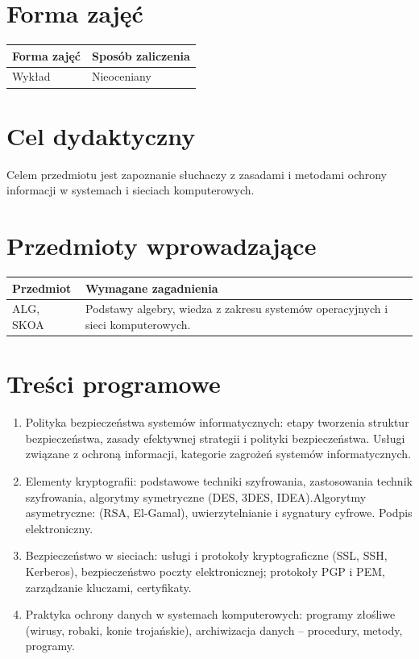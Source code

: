 \documentclass[12pt, a4paper]{article}
\begin{document}
\section{Forma zajęć}

\begin{tabular}{ll}
  \hline
  \textbf{Forma zajęć} & \textbf{Sposób zaliczenia} \\
  \hline
  Wykład & Nieoceniany \\
  \hline
\end{tabular}

\section{Cel dydaktyczny}

Celem przedmiotu jest zapoznanie słuchaczy z zasadami i metodami ochrony informacji w systemach i sieciach komputerowych.

\section{Przedmioty wprowadzające}

\begin{tabularx}{\textwidth}{lX}
  \hline
  \textbf{Przedmiot} & \textbf{Wymagane zagadnienia} \\
  \hline
  ALG, SKOA & Podstawy algebry, wiedza z zakresu systemów operacyjnych i sieci komputerowych. \\
  \hline
\end{tabularx}

\section{Treści programowe}

\begin{enumerate}
  \item Polityka bezpieczeństwa systemów informatycznych: etapy tworzenia struktur bezpieczeństwa, zasady efektywnej strategii i polityki bezpieczeństwa. Usługi związane z ochroną informacji, kategorie zagrożeń systemów informatycznych.
  \item Elementy kryptografii: podstawowe techniki szyfrowania, zastosowania technik szyfrowania, algorytmy symetryczne (DES, 3DES, IDEA).Algorytmy asymetryczne: (RSA, El-Gamal), uwierzytelnianie i sygnatury cyfrowe. Podpis elektroniczny.
  \item Bezpieczeństwo w sieciach: usługi i protokoły kryptograficzne (SSL, SSH, Kerberos), bezpieczeństwo poczty elektronicznej; protokoły PGP i PEM, zarządzanie kluczami, certyfikaty.
  \item Praktyka ochrony danych w systemach komputerowych: programy złośliwe (wirusy, robaki, konie trojańskie), archiwizacja danych – procedury, metody, programy.
\end{enumerate}
\end{document}
